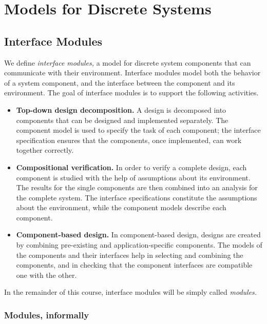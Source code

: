 \documentclass[11pt]{report}
\begin{document}
\chapter{Models for Discrete Systems}

\section{Interface Modules}

We define {\em interface modules,} a model for discrete system
components that can communicate with their environment.
Interface modules model both the behavior of a system component, and
the interface between the component and its environment.
The goal of interface modules is to support the following activities.
%
\begin{itemize}

\item {\bf Top-down design decomposition.}
A design is decomposed into components that can be designed and
implemented separately.
The component model is used to specify the task of each component; the
interface specification ensures that the components, once implemented,
can work together correctly.

\item {\bf Compositional verification.}
In order to verify a complete design, each component is studied with
the help of assumptions about its environment.
The results for the single components are then combined into an
analysis for the complete system.
The interface specifications constitute the assumptions about the
environment, while the component models describe each component.

\item {\bf Component-based design.}
In component-based design, designs are created by combining
pre-existing and application-specific components.
The models of the components and their interfaces help in selecting
and combining the components, and in checking that the component
interfaces are compatible one with the other.

\end{itemize}
%
In the remainder of this course, interface modules will be simply
called {\em modules.}


\subsection{Modules, informally}
\end{document}
